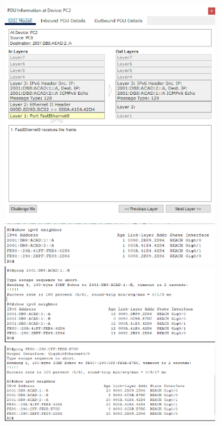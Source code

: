 \documentclass[12pt]{article}
\begin{document}
 \includegraphics[width=0.7\textwidth]{../tpipv6/imagenes/imagen4}
 \includegraphics[width=0.7\textwidth]{../tpipv6/imagenes/imagen5}
 \includegraphics[width=0.7\textwidth]{../tpipv6/imagenes/imagen6}
 \includegraphics[width=0.7\textwidth]{../tpipv6/imagenes/imagen7}
 
\end{document}
